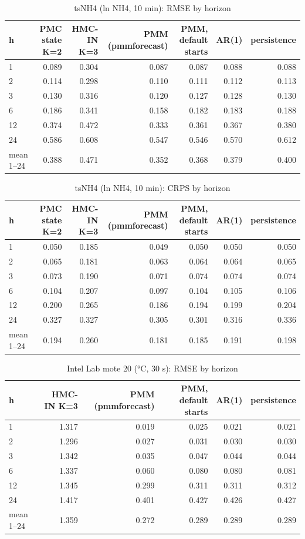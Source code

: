 \begin{table}[ht]\centering\small
\caption{tsNH4 (ln NH4, 10 min): RMSE by horizon}
\begin{tabular}{lrrrrrr}
\hline
h & PMC state K=2 & HMC-IN K=3 & PMM (pmmforecast) & PMM, default starts & AR(1) & persistence \\ \hline
1 & 0.089 & 0.304 & 0.087 & 0.087 & 0.088 & 0.088 \\
2 & 0.114 & 0.298 & 0.110 & 0.111 & 0.112 & 0.113 \\
3 & 0.130 & 0.316 & 0.120 & 0.127 & 0.128 & 0.130 \\
6 & 0.186 & 0.341 & 0.158 & 0.182 & 0.183 & 0.188 \\
12 & 0.374 & 0.472 & 0.333 & 0.361 & 0.367 & 0.380 \\
24 & 0.586 & 0.608 & 0.547 & 0.546 & 0.570 & 0.612 \\
mean 1–24 & 0.388 & 0.471 & 0.352 & 0.368 & 0.379 & 0.400 \\
\hline\end{tabular}\end{table}

\begin{table}[ht]\centering\small
\caption{tsNH4 (ln NH4, 10 min): CRPS by horizon}
\begin{tabular}{lrrrrrr}
\hline
h & PMC state K=2 & HMC-IN K=3 & PMM (pmmforecast) & PMM, default starts & AR(1) & persistence \\ \hline
1 & 0.050 & 0.185 & 0.049 & 0.050 & 0.050 & 0.050 \\
2 & 0.065 & 0.181 & 0.063 & 0.064 & 0.064 & 0.065 \\
3 & 0.073 & 0.190 & 0.071 & 0.074 & 0.074 & 0.074 \\
6 & 0.104 & 0.207 & 0.097 & 0.104 & 0.105 & 0.106 \\
12 & 0.200 & 0.265 & 0.186 & 0.194 & 0.199 & 0.204 \\
24 & 0.327 & 0.327 & 0.305 & 0.301 & 0.316 & 0.336 \\
mean 1–24 & 0.194 & 0.260 & 0.181 & 0.185 & 0.191 & 0.198 \\
\hline\end{tabular}\end{table}

\begin{table}[ht]\centering\small
\caption{Intel Lab mote 20 (°C, 30 s): RMSE by horizon}
\begin{tabular}{lrrrrr}
\hline
h & HMC-IN K=3 & PMM (pmmforecast) & PMM, default starts & AR(1) & persistence \\ \hline
1 & 1.317 & 0.019 & 0.025 & 0.021 & 0.021 \\
2 & 1.296 & 0.027 & 0.031 & 0.030 & 0.030 \\
3 & 1.342 & 0.035 & 0.047 & 0.044 & 0.044 \\
6 & 1.337 & 0.060 & 0.080 & 0.080 & 0.081 \\
12 & 1.345 & 0.299 & 0.311 & 0.311 & 0.312 \\
24 & 1.417 & 0.401 & 0.427 & 0.426 & 0.427 \\
mean 1–24 & 1.359 & 0.272 & 0.289 & 0.289 & 0.289 \\
\hline\end{tabular}\end{table}

